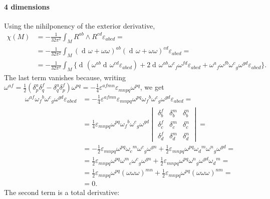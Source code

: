 \documentclass[a4paper,12pt]{book}
\newcommand{\dd}{\mathop{\mathrm{d}\!}{}}
\renewcommand{\epsilon}{\varepsilon}
\theoremstyle{definition}
\theoremstyle{remark}
\begin{document}
\paragraph{4 dimensions}
Using the nihilponency of the exterior derivative,
\begin{align*}
\chi(M)&=-\frac1{32\pi^2}\int_MR^{ab}\wedge R^{cd}\epsilon_{abcd}=\\
&=-\frac1{32\pi^2}\int_M(\dd\omega+\omega\omega)^{ab}(\dd\omega+\omega\omega)^{cd}\epsilon_{abcd}=\\
&=-\frac1{32\pi^2}\int_M\bigl\{\dd(\omega^{ab}\dd\omega^{cd}\epsilon_{abcd})+2\dd\omega^{ab}\omega^c{}_f\omega^{fd}\epsilon_{abcd}+\omega^a{}_f\omega^{fb}\omega^c{}_g\omega^{gd}\epsilon_{abcd}\bigr\}.
\end{align*}
The last term vanishes because, writing $\omega^{af}=\frac12(\delta^a_p\delta^f_q-\delta^a_q\delta^f_p)\omega^{pq}=-\frac14\epsilon^{afmn}\epsilon_{mnpq}\omega^{pq}$, we get
\begin{align*}
\omega^{af}\omega_f{}^b\omega^c{}_g\omega^{gd}\epsilon_{abcd}&=-\frac14\epsilon^{afmn}\epsilon_{mnpq}\omega^{pq}\omega_f{}^b\omega^c{}_g\omega^{gd}\epsilon_{abcd}=\\
&=\frac14\epsilon_{mnpq}\omega^{pq}\omega_f{}^b\omega^c{}_g\omega^{gd}
\begin{vmatrix}
\delta^f_b & \delta^m_b & \delta^n_b\\
\delta^f_c & \delta^m_c & \delta_c^n\\
\delta^f_d & \delta^m_d & \delta^n_d
\end{vmatrix}=\\
&=-\frac12\epsilon_{mnpq}\omega^{pq}\omega_c{}^m\omega^c{}_g\omega^{gn}+\frac12\epsilon_{mnpq}\omega^{pq}\omega_d{}^m\omega^n{}_g\omega^{gd}=\\
&=\frac12\epsilon_{mnpq}\omega^{pq}\omega^m{}_c\omega^c{}_g\omega^{gn}+\frac12\epsilon_{mnpq}\omega^{pq}\omega^n{}_g\omega^{gd}\omega_d{}^m=\\
&=\frac12\epsilon_{mnpq}\omega^{pq}(\omega\omega\omega)^{mn}+\frac12\epsilon_{mnpq}\omega^{pq}(\omega\omega\omega)^{nm}=\\
&=0.
\end{align*}
The second term is a total derivative:
\end{document}
